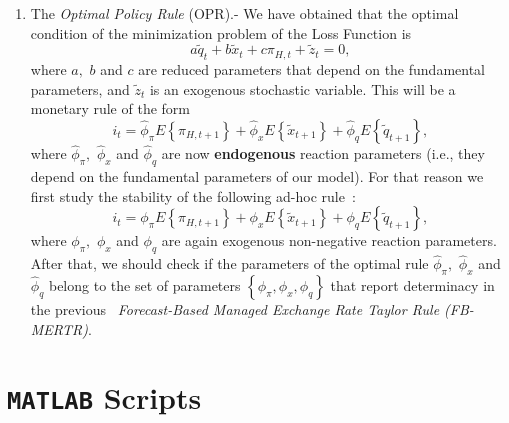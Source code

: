 \documentclass[11pt]{article}
\begin{document}
\begin{enumerate}
\item The \textit{Optimal Policy Rule} (OPR).- We have obtained that the
optimal condition of the minimization problem of the Loss Function is%
\begin{equation}
a\widetilde{q}_{t}+b\widetilde{x}_{t}+c\pi _{H,t}+\widetilde{z}_{t}=0,
\label{OPR}
\end{equation}%
where $a,$ $b$ and $c$ are reduced parameters that depend on the fundamental
parameters, and $\widetilde{z}_{t}$ is an exogenous stochastic variable.
This will be a monetary rule of the form%
\begin{equation*}
i_{t}=\widehat{\phi }_{\pi }E\left\{ \pi _{H,t+1}\right\} +\widehat{\phi }%
_{x}E\left\{ \widetilde{x}_{t+1}\right\} +\widehat{\phi }_{q}E\left\{ 
\widetilde{q}_{t+1}\right\} ,
\end{equation*}%
where $\widehat{\phi }_{\pi },$ $\widehat{\phi }_{x}$ and $\widehat{\phi }%
_{q}$ are now \textbf{endogenous} reaction parameters (i.e., they depend on
the fundamental parameters of our model). For that reason we first study the
stability of the following ad-hoc rule\ :%
\begin{equation}
i_{t}=\phi _{\pi }E\left\{ \pi _{H,t+1}\right\} +\phi _{x}E\left\{ 
\widetilde{x}_{t+1}\right\} +\phi _{q}E\left\{ \widetilde{q}_{t+1}\right\} ,
\label{FB-ERTR}
\end{equation}%
where $\phi _{\pi },$ $\phi _{x}$ and $\phi _{q}$ are again exogenous
non-negative reaction parameters. After that, we should check if the
parameters of the optimal rule $\widehat{\phi }_{\pi },$ $\widehat{\phi }_{x}
$ and $\widehat{\phi }_{q}$ belong to the set of parameters $\left\{ \phi
_{\pi },\phi _{x},\phi _{q}\right\} $ that report determinacy in the previous%
\textit{\ Forecast-Based Managed Exchange Rate Taylor Rule (FB-MERTR)}.
\end{enumerate}

\section{\texttt{MATLAB} Scripts}
\end{document}
